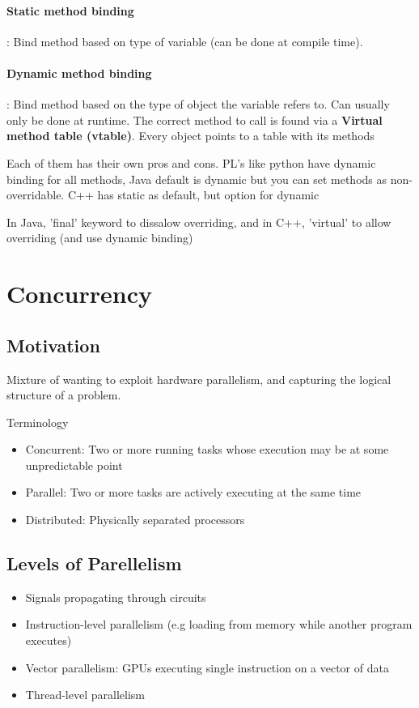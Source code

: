 \documentclass{article}
\begin{document}
\paragraph{Static method binding}: Bind method based on type of variable (can be done at compile time).

\paragraph{Dynamic method binding}: Bind method based on the type of object the variable refers to. Can usually only be done at runtime. The correct method to call is found via a \textbf{Virtual method table (vtable)}. Every object points to a table with its methods

Each of them has their own pros and cons. PL's like python have dynamic binding for all methods, Java default is dynamic but you can set methods as non-overridable. C++ has static as default, but option for dynamic

In Java, 'final' keyword to dissalow overriding, and in C++, 'virtual' to allow overriding (and use dynamic binding) 
\section{Concurrency}
\subsection{Motivation}
Mixture of wanting to exploit hardware parallelism, and capturing the logical structure of a problem.

Terminology
\begin{itemize}
  \item Concurrent: Two or more running tasks whose execution
may be at some unpredictable point
  \item Parallel: Two or more tasks are actively executing at the
same time
  \item Distributed: Physically separated processors
\end{itemize}

\subsection{Levels of Parellelism}
\begin{itemize}
  \item Signals propagating through circuits
  \item Instruction-level parallelism (e.g loading from memory while another program executes)
  \item Vector parallelism: GPUs executing single instruction on a vector of data
  \item Thread-level parallelism
\end{itemize}
\end{document}
